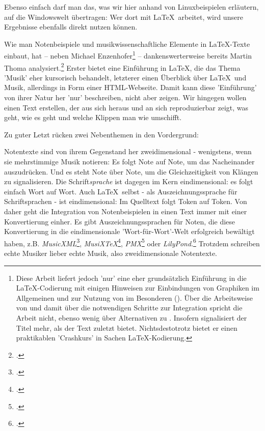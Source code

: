 Ebenso einfach darf man das, was wir hier anhand von Linuxbeispielen erläutern,
auf die Windowswelt übertragen: Wer dort mit \LaTeX\ arbeitet, wird unsere
Ergebnisse ebenfalls direkt nutzen können.

Wie man Notenbeispiele und musikwissenschaftliche Elemente in \LaTeX-Texte
einbaut, hat -- neben Michael Enzenhofer\footnote{Diese Arbeit liefert jedoch
'nur' eine eher grundsätzlich Einführung in die \LaTeX-Co\-die\-rung mit einigen
Hinweisen zur Einbindungen von Graphiken im Allgemeinen und zur Nutzung von
 im Besonderen (\cite[vgl. dazu][4ff, 31ff u.
21ff]{Enzenhofer2016a}). Über die Arbeitsweise von  und damit über
die notwendigen Schritte zur Integration spricht die Arbeit nicht, ebenso wenig
über Alternativen zu . Insofern signalisiert der Titel mehr, als
der Text zuletzt bietet. Nichtsdestotrotz bietet er einen praktikablen
'Crashkurs' in Sachen \LaTeX-Kodierung.} -- dankenswerterweise bereits Martin
Thoma analysiert.\footcite[vgl.][\nopage wp]{Thoma2018a} Erster bietet eine
Einführung in \LaTeX, die das Thema 'Musik' eher kursorisch behandelt, letzterer
einen Überblick über \LaTeX\ und Musik, allerdings in Form einer HTML-Webseite.
Damit kann diese 'Einführung' von ihrer Natur her 'nur' beschreiben, nicht aber
zeigen. Wir hingegen wollen einen Text erstellen, der aus sich heraus und an
sich reproduzierbar zeigt, was geht, wie es geht und welche Klippen man wie
umschifft.

Zu guter Letzt rücken zwei Nebenthemen in den Vordergrund:

Notentexte sind von ihrem Gegenstand her zweidimensional - wenigstens, wenn sie
mehrstimmige Musik notieren: Es folgt Note auf Note, um das Nacheinander
auszudrücken. Und es steht Note über Note, um die Gleichzeitigkeit von Klängen
zu signalisieren. Die Schrift\textit{sprache} ist dagegen im Kern eindimensional:
es folgt einfach Wort auf Wort. Auch \LaTeX\ selbst - als Auszeichnungssprache
für Schriftsprachen - ist eindimensional: Im Quelltext folgt Token auf Token.
Von daher geht die Integration von Notenbeispielen in einen Text immer mit einer
Konvertierung einher. Es gibt Auszeichnungssprachen für Noten, die diese
Konvertierung in die eindimensionale 'Wort-für-Wort'-Welt erfolgreich bewältigt
haben, z.B. \textit{MusicXML}\footcite[vgl.][\nopage wp]{MusicXML2018a},
\textit{MusiX\TeX}\footcite[vgl.][\nopage wp]{CtanMusixTex2018a},
\textit{PMX}\footcite[vgl.][\nopage wp]{CtanPmx2018a} oder
\textit{LilyPond}.\footcite[vgl.][\nopage wp]{LilyPond2018a} Trotzdem schreiben
echte Musiker lieber echte Musik, also zweidimensionale Notentexte.


